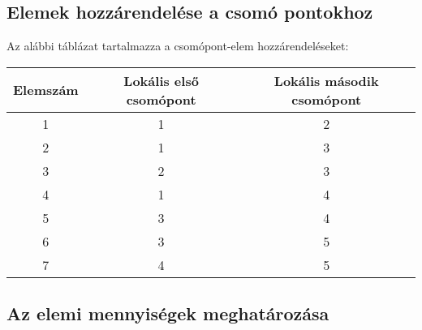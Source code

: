 \documentclass[12pt,a4paper]{article}
\begin{document}
\subsection{Elemek hozzárendelése a csomó pontokhoz}
Az alábbi táblázat tartalmazza a csomópont-elem hozzárendeléseket:
\begin{center}
    \begin{tabular}{|c|c|c|}
        \hline
        Elemszám & Lokális első csomópont & Lokális második csomópont \\
        \hline
        \hline
        1        & 1                      & 2                         \\
        \hline
        2        & 1                      & 3                         \\
        \hline
        3        & 2                      & 3                         \\
        \hline
        4        & 1                      & 4                         \\
        \hline
        5        & 3                      & 4                         \\
        \hline
        6        & 3                      & 5                         \\
        \hline
        7        & 4                      & 5                         \\
        \hline
    \end{tabular}
\end{center}
\subsection{Az elemi mennyiségek meghatározása}
\end{document}
